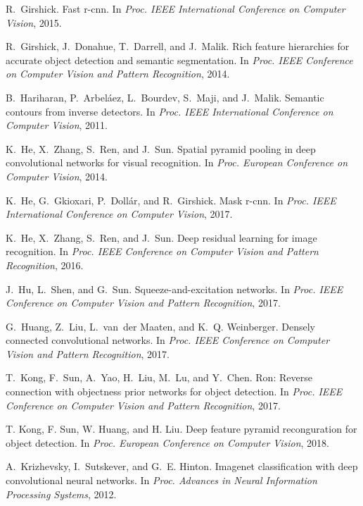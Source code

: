 \documentclass[10pt,twocolumn,letterpaper]{article}
\begin{document}
\begin{thebibliography}{10}
R.~Girshick.
\newblock Fast r-cnn.
\newblock In {\em Proc. IEEE International Conference on Computer Vision}, 2015.

R.~Girshick, J.~Donahue, T.~Darrell, and J.~Malik.
\newblock Rich feature hierarchies for accurate object detection and semantic segmentation.
\newblock In {\em Proc. IEEE Conference on Computer Vision and  Pattern Recognition}, 2014.

B.~Hariharan, P.~Arbel{\'a}ez, L.~Bourdev, S.~Maji, and J.~Malik.
\newblock Semantic contours from inverse detectors.
\newblock In {\em Proc. IEEE International Conference on Computer Vision},  2011.
  
K.~He, X.~Zhang, S.~Ren, and J.~Sun.
\newblock Spatial pyramid pooling in deep convolutional networks for visual recognition.
\newblock In {\em Proc. European Conference on Computer Vision}, 2014.  

K.~He, G.~Gkioxari, P.~Doll{\'a}r, and R.~Girshick.
\newblock Mask r-cnn.
\newblock In {\em Proc. IEEE International Conference on Computer  Vision}, 2017.

K.~He, X.~Zhang, S.~Ren, and J.~Sun.
\newblock Deep residual learning for image recognition.
\newblock In {\em Proc. IEEE Conference on Computer Vision and Pattern Recognition}, 2016.

J.~Hu, L.~Shen, and G.~Sun.
\newblock Squeeze-and-excitation networks.
\newblock In {\em Proc. IEEE Conference on Computer Vision and Pattern Recognition}, 2017.

G.~Huang, Z.~Liu, L.~van~der Maaten, and K.~Q. Weinberger.
\newblock Densely connected convolutional networks.
\newblock In {\em Proc. IEEE Conference on Computer Vision and Pattern Recognition}, 2017.

T.~Kong, F.~Sun, A.~Yao, H.~Liu, M.~Lu, and Y.~Chen.
\newblock Ron: Reverse connection with objectness prior networks for object detection.
\newblock In {\em Proc. IEEE Conference on Computer Vision and Pattern Recognition}, 2017.

T. Kong, F. Sun, W. Huang, and H. Liu.
Deep feature pyramid reconguration for object detection.
\newblock In {\em Proc. European Conference on Computer Vision}, 2018. 

A.~Krizhevsky, I.~Sutskever, and G.~E. Hinton.
\newblock Imagenet classification with deep convolutional neural networks.
\newblock In {\em Proc. Advances in Neural Information Processing Systems}, 2012.


\end{thebibliography}
\end{document}
